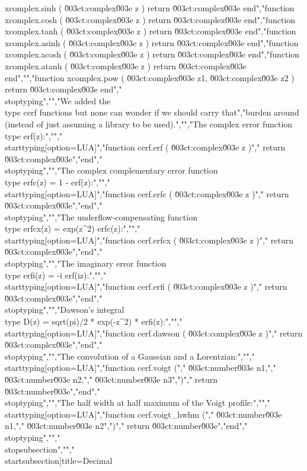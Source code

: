 xcomplex.sinh  ( \u003ct:complex\u003e z ) return \u003ct:complex\u003e end","function xcomplex.cosh  ( \u003ct:complex\u003e z ) return \u003ct:complex\u003e end","function xcomplex.tanh  ( \u003ct:complex\u003e z ) return \u003ct:complex\u003e end","function xcomplex.asinh ( \u003ct:complex\u003e z ) return \u003ct:complex\u003e end","function xcomplex.acosh ( \u003ct:complex\u003e z ) return \u003ct:complex\u003e end","function xcomplex.atanh ( \u003ct:complex\u003e z ) return \u003ct:complex\u003e end","","function xcomplex.pow   ( \u003ct:complex\u003e z1, \u003ct:complex\u003e z2 ) return \u003ct:complex\u003e end","\\stoptyping","","We added the \\type {cerf} functions but none can wonder if we should carry that","burden around (instead of just assuming a library to be used).","","The complex error function \\type {erf(z)}:","","\\starttyping[option=LUA]","function cerf.erf ( \u003ct:complex\u003e z )","    return \u003ct:complex\u003e","end","\\stoptyping","","The complex complementary error function \\type {erfc(z) = 1 - erf(z)}:","","\\starttyping[option=LUA]","function cerf.erfc ( \u003ct:complex\u003e z )","    return \u003ct:complex\u003e","end","\\stoptyping","","The underflow-compensating function \\type {erfcx(z) = exp(z^2) erfc(z)}:","","\\starttyping[option=LUA]","function cerf.erfcx ( \u003ct:complex\u003e z )","    return \u003ct:complex\u003e","end","\\stoptyping","","The imaginary error function \\type {erfi(z) = -i erf(iz)}:","","\\starttyping[option=LUA]","function cerf.erfi ( \u003ct:complex\u003e z )","    return \u003ct:complex\u003e","end","\\stoptyping","","Dawson's integral \\type {D(z) = sqrt(pi)/2 * exp(-z^2) * erfi(z)}:","","\\starttyping[option=LUA]","function cerf.dawson ( \u003ct:complex\u003e z )","    return \u003ct:complex\u003e","end","\\stoptyping","","The convolution of a Gaussian and a Lorentzian:","","\\starttyping[option=LUA]","function cerf.voigt (","    \u003ct:number\u003e n1,","    \u003ct:number\u003e n2,","    \u003ct:number\u003e n3",")","    return \u003ct:number\u003e","end","\\stoptyping","","The half width at half maximum of the Voigt profile:","","\\starttyping[option=LUA]","function cerf.voigt_hwhm (","    \u003ct:number\u003e n1,","    \u003ct:number\u003e n2",")","    return \u003ct:number\u003e","end","\\stoptyping","","\\stopsubsection","","\\startsubsection[title=Decimal 